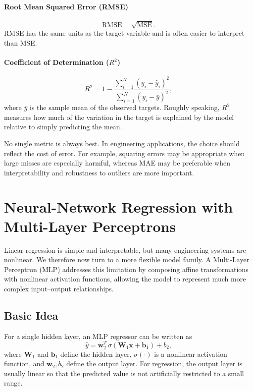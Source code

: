 \documentclass[12pt]{article}
\begin{document}
\paragraph{Root Mean Squared Error (RMSE)}
\begin{equation}
\mathrm{RMSE} = \sqrt{\mathrm{MSE}}.
\end{equation}
RMSE has the same units as the target variable and is often easier to interpret than MSE.

\paragraph{Coefficient of Determination ($R^2$)}
\begin{equation}
R^2 = 1 - \frac{\sum_{i=1}^N (y_i - \hat{y}_i)^2}{\sum_{i=1}^N (y_i - \bar{y})^2},
\end{equation}
where $\bar{y}$ is the sample mean of the observed targets. Roughly speaking, $R^2$ measures how much of the variation in the target is explained by the model relative to simply predicting the mean.

No single metric is always best. In engineering applications, the choice should reflect the cost of error. For example, squaring errors may be appropriate when large misses are especially harmful, whereas MAE may be preferable when interpretability and robustness to outliers are more important.

\section{Neural-Network Regression with Multi-Layer Perceptrons}

Linear regression is simple and interpretable, but many engineering systems are nonlinear. We therefore now turn to a more flexible model family. A Multi-Layer Perceptron (MLP) addresses this limitation by composing affine transformations with nonlinear activation functions, allowing the model to represent much more complex input--output relationships.

\subsection{Basic Idea}

For a single hidden layer, an MLP regressor can be written as
\begin{equation}
\hat{y} = \mathbf{w}_2^T\,\sigma(\mathbf{W}_1\mathbf{x} + \mathbf{b}_1) + b_2,
\end{equation}
where $\mathbf{W}_1$ and $\mathbf{b}_1$ define the hidden layer, $\sigma(\cdot)$ is a nonlinear activation function, and $\mathbf{w}_2, b_2$ define the output layer. For regression, the output layer is usually linear so that the predicted value is not artificially restricted to a small range.
\end{document}
